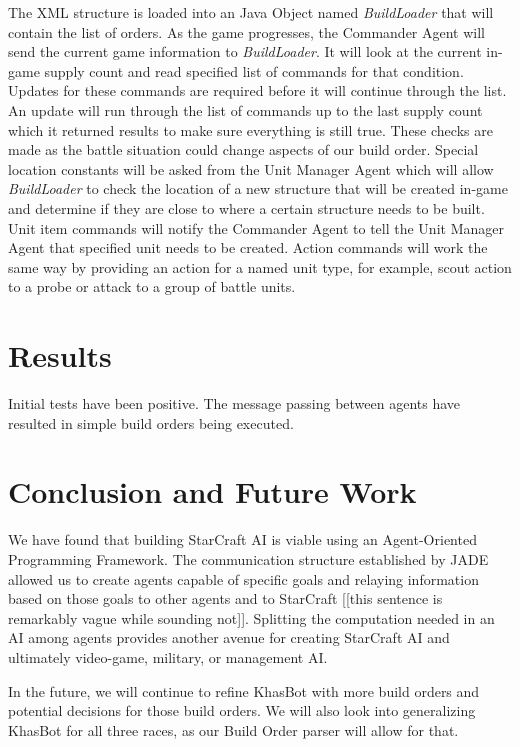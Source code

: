 \documentclass[letterpaper]{article}
\begin{document}
The XML structure is loaded into an Java Object named \emph{BuildLoader} that will contain the list of orders. As the game progresses, the Commander Agent will send the current game information to \emph{BuildLoader}. It will look at the current in-game supply count and read specified list of commands for that condition. Updates for these commands are required before it will continue through the list.  An update will run through the list of commands up to the last supply count which it returned results to make sure everything is still true. These checks are made as the battle situation could change aspects of our build order. Special location constants will be asked from the Unit Manager Agent which will allow \emph{BuildLoader} to check the location of a new structure that will be created in-game and determine if they are close to where a certain structure needs to be built. Unit item commands will notify the Commander Agent to tell the Unit Manager Agent that specified unit needs to be created. Action commands will work the same way by providing an action for a named unit type, for example, scout action to a probe or attack to a group of battle units.

\section{Results}
Initial tests have been positive.  The message passing between agents have resulted in simple build orders being executed.

\section{Conclusion and Future Work}
We have found that building StarCraft AI is viable using an Agent-Oriented Programming Framework.  The communication structure established by JADE allowed us to create agents capable of specific goals and relaying information based on those goals to other agents and to StarCraft
[[this sentence is remarkably vague while sounding not]].  Splitting the computation needed in an AI among agents provides another avenue for creating StarCraft AI and ultimately video-game, military, or management AI.

In the future, we will continue to refine KhasBot with more build orders and potential decisions for those build orders.  We will also look into generalizing KhasBot for all three races, as our Build Order parser will allow for that.

{}

\end{document}
